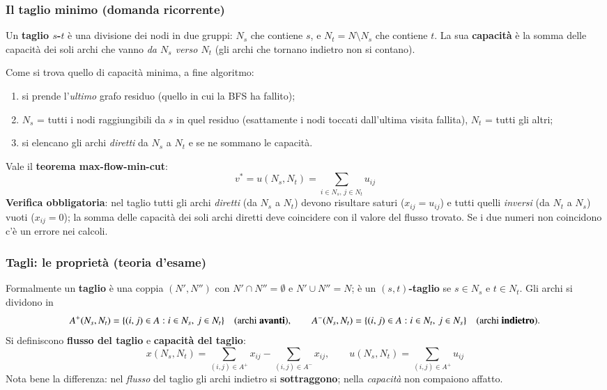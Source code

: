 \documentclass[12pt]{extarticle} %
\begin{document}
\subsubsection{Il taglio minimo (domanda ricorrente)}
Un \textbf{taglio $s$-$t$} è una divisione dei nodi in due gruppi: $N_s$ che contiene $s$, e $N_t = N \setminus N_s$ che contiene $t$. La sua \textbf{capacità} è la somma delle capacità dei soli archi che vanno \emph{da $N_s$ verso $N_t$} (gli archi che tornano indietro non si contano).

\noindent Come si trova quello di capacità minima, a fine algoritmo:
\begin{enumerate}
    \item si prende l'\emph{ultimo} grafo residuo (quello in cui la BFS ha fallito);
    \item $N_s$ = tutti i nodi raggiungibili da $s$ in quel residuo (esattamente i nodi toccati dall'ultima visita fallita), $N_t$ = tutti gli altri;
    \item si elencano gli archi \emph{diretti} da $N_s$ a $N_t$ e se ne sommano le capacità.
\end{enumerate}
Vale il \textbf{teorema max-flow-min-cut}:
\[
v^* = u(N_s,N_t) = \sum_{i \in N_s,\, j \in N_t} u_{ij}
\]
\textbf{Verifica obbligatoria}: nel taglio tutti gli archi \textit{diretti} (da $N_s$ a $N_t$) devono risultare saturi ($x_{ij}=u_{ij}$) e tutti quelli \textit{inversi} (da $N_t$ a $N_s$) vuoti ($x_{ij}=0$); la somma delle capacità dei soli archi diretti deve coincidere con il valore del flusso trovato. Se i due numeri non coincidono c'è un errore nei calcoli.

\subsubsection{Tagli: le proprietà (teoria d'esame)}
Formalmente un \textbf{taglio} è una coppia $(N',N'')$ con $N' \cap N'' = \emptyset$ e $N' \cup N'' = N$; è un \textbf{$(s,t)$-taglio} se $s \in N_s$ e $t \in N_t$. Gli archi si dividono in
\[
A^+(N_s,N_t) = \{(i,j) \in A : i \in N_s,\, j \in N_t\} \quad\text{(archi \textbf{avanti})}, \qquad
A^-(N_s,N_t) = \{(i,j) \in A : i \in N_t,\, j \in N_s\} \quad\text{(archi \textbf{indietro})}.
\]
Si definiscono \textbf{flusso del taglio} e \textbf{capacità del taglio}:
\[
x(N_s,N_t) = \sum_{(i,j)\in A^+} x_{ij} - \sum_{(i,j)\in A^-} x_{ij},
\qquad
u(N_s,N_t) = \sum_{(i,j)\in A^+} u_{ij}
\]
\noindent Nota bene la differenza: nel \emph{flusso} del taglio gli archi indietro si \textbf{sottraggono}; nella \emph{capacità} non compaiono affatto.
\end{document}

